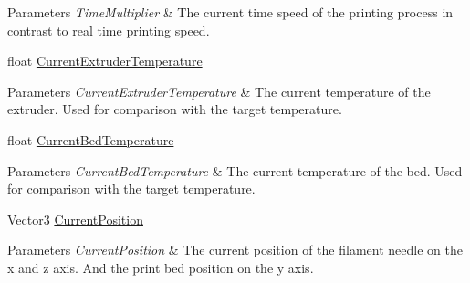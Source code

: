 \begin{DoxyCompactItemize}
\begin{DoxyCompactList}\small\item\em 
\begin{DoxyParams}{Parameters}
{\em Time\+Multiplier} & The current time speed of the printing process in contrast to real time printing speed.\\
\hline
\end{DoxyParams}
\end{DoxyCompactList}\item 
\mbox{\label{class_printer_a80b4b7ffb6cd2c3ca827f607d9515c79}} 
float \hyperlink{class_printer_a80b4b7ffb6cd2c3ca827f607d9515c79}{Current\+Extruder\+Temperature}
\begin{DoxyCompactList}\small\item\em 
\begin{DoxyParams}{Parameters}
{\em Current\+Extruder\+Temperature} & The current temperature of the extruder. Used for comparison with the target temperature.\\
\hline
\end{DoxyParams}
\end{DoxyCompactList}\item 
\mbox{\label{class_printer_a5cf3a0f0aa0ed27d0cb197d2b4a39266}} 
float \hyperlink{class_printer_a5cf3a0f0aa0ed27d0cb197d2b4a39266}{Current\+Bed\+Temperature}
\begin{DoxyCompactList}\small\item\em 
\begin{DoxyParams}{Parameters}
{\em Current\+Bed\+Temperature} & The current temperature of the bed. Used for comparison with the target temperature.\\
\hline
\end{DoxyParams}
\end{DoxyCompactList}\item 
\mbox{\label{class_printer_a4e4806b500d06b25ec0dd4d9ea63ab9c}} 
Vector3 \hyperlink{class_printer_a4e4806b500d06b25ec0dd4d9ea63ab9c}{Current\+Position}
\begin{DoxyCompactList}\small\item\em 
\begin{DoxyParams}{Parameters}
{\em Current\+Position} & The current position of the filament needle on the x and z axis. And the print bed position on the y axis.\\
\hline
\end{DoxyParams}

\end{DoxyCompactList}
\end{DoxyCompactItemize}
